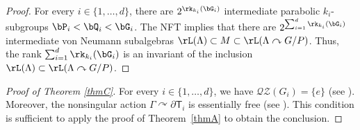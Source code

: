 \begin{proof}
For every $i \in \{1, \dots, d\}$, there are $2^{\rk_{k_i}(\bG_i)}$ intermediate parabolic $k_i$-subgroups $\bP_i < \bQ_i < \bG_i$. The NFT implies that there are $2^{\sum_{i = 1}^d \rk_{k_i}(\bG_i)}$ intermediate von Neumann subalgebras $\rL(\Lambda) \subset M \subset \rL(\Lambda \curvearrowright G/P)$. Thus, the rank $\sum_{i = 1}^d \rk_{k_i}(\bG_i)$ is an invariant of the inclusion $\rL(\Lambda) \subset \rL(\Lambda \curvearrowright G/P)$.
\end{proof}

\begin{proof}[Proof of Theorem \ref{thmC}]
For every $i \in \{1, \dots, d\}$, we have $\mathscr{Q}\mathscr{Z}(G_i) = \{e\}$ (see \cite[Lem.\,3.1.1 \& Prop.\,3.1.2]{BM00a}). Moreover, the nonsingular action $\Gamma \curvearrowright \partial \mathsf T_i$ is essentially free (see \cite[Prop.\,6.4]{BBHP20}). This condition is sufficient to apply the proof of Theorem~\ref{thmA} to obtain the conclusion.
\end{proof}
